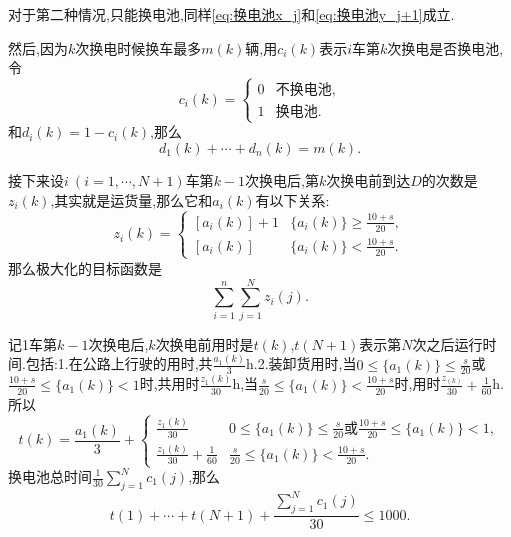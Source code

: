 \documentclass[12pt,a4paper,oneside]{ctexart}
\begin{document}
对于第二种情况,只能换电池,同样\eqref{eq:换电池x_j}和\eqref{eq:换电池y_j+1}成立.

然后,因为$k$次换电时候换车最多$m(k)$辆,用$c_i(k)$表示$i$车第$k$次换电是否换电池,令
\begin{equation}
  c_i(k)=\begin{cases}
    0 & \mbox{不换电池},\\
    1 & \mbox{换电池}.
  \end{cases}
\end{equation}
和$d_i(k)=1-c_i(k)$,那么
\begin{equation}
  d_1(k)+\cdots+d_n(k)=m(k).
\end{equation}

接下来设$i\ (i=1,\cdots,N+1)$车第$k-1$次换电后,第$k$次换电前到达$D$的次数是$z_i(k)$,其实就是运货量,那么它和$a_i(k)$有以下关系:
\begin{equation}
  z_i(k)=\begin{cases}
    [a_i(k)]+1 & \{a_i(k)\}\geqslant \frac{10+s}{20},\\
    [a_i(k)] & \{a_i(k)\}<\frac{10+s}{20}.
  \end{cases}
\end{equation}
那么极大化的目标函数是
\begin{equation}
  \sum_{i=1}^n\sum_{j=1}^Nz_i(j).
\end{equation}

记1车第$k-1$次换电后,$k$次换电前用时是$t(k)$,$t(N+1)$表示第$N$次之后运行时间.包括:1.在公路上行驶的用时,共$\frac{a_1(k)}{3}$h.2.装卸货用时,当$0\leqslant \{a_1(k)\}\leqslant \frac{s}{20}$或
$\frac{10+s}{20}\leqslant \{a_1(k)\}<1$时,共用时$\frac{z_1(k)}{30}$h,当$\frac{s}{20}\leqslant \{a_1(k)\}<\frac{10+s}{20}$时,用时$\frac{z_(k)}{30}+\frac{1}{60}$h.
所以 
\begin{equation}
  t(k)=\frac{a_1(k)}{3}+\begin{cases}
    \frac{z_1(k)}{30} & 0\leqslant \{a_1(k)\}\leqslant \frac{s}{20}\mbox{或}\frac{10+s}{20}\leqslant \{a_1(k)\}<1,\\
    \frac{z_1(k)}{30}+\frac{1}{60} & \frac{s}{20}\leqslant \{a_1(k)\}<\frac{10+s}{20}.
  \end{cases}
\end{equation}
换电池总时间$\frac{1}{30}\sum_{j=1}^Nc_1(j)$,那么
\begin{equation}
  t(1)+\cdots+t(N+1)+\frac{\sum_{j=1}^Nc_1(j)}{30}\leqslant 1000.
\end{equation}
\end{document}
